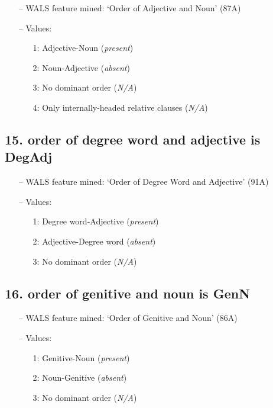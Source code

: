 \begin{itemize}
\item[--] WALS feature mined: `Order of Adjective and Noun' (87A)
\item[--] Values:

\begin{enumerate}
\item[1:] Adjective-Noun (\emph{present})
\item[2:] Noun-Adjective (\emph{absent})
\item[3:] No dominant order (\emph{N/A})
\item[4:] Only internally-headed relative clauses (\emph{N/A})
\end{enumerate}
\end{itemize}

\subsection*{15. order of degree word and adjective is DegAdj}

\begin{itemize}
\item[--] WALS feature mined: `Order of Degree Word and Adjective' (91A)
\item[--] Values:

\begin{enumerate}
\item[1:] Degree word-Adjective (\emph{present})
\item[2:] Adjective-Degree word (\emph{absent})
\item[3:] No dominant order (\emph{N/A})
\end{enumerate}
\end{itemize}

\subsection*{16. order of genitive and noun is GenN}

\begin{itemize}
\item[--] WALS feature mined: `Order of Genitive and Noun' (86A)
\item[--] Values:

\begin{enumerate}
\item[1:] Genitive-Noun (\emph{present})
\item[2:] Noun-Genitive (\emph{absent})
\item[3:] No dominant order (\emph{N/A})
\end{enumerate}
\end{itemize}

